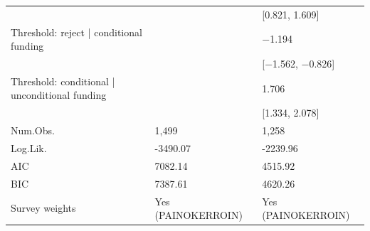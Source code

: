 \begin{tabular}{lll}
&  & [\num{0.821}, \num{1.609}] \\
Threshold: reject | conditional funding &  & \num{-1.194} \\
&  & [\num{-1.562}, \num{-0.826}] \\
Threshold: conditional | unconditional funding &  & \num{1.706} \\
&  & [\num{1.334}, \num{2.078}] \\
Num.Obs. & 1,499 & 1,258 \\
Log.Lik. & -3490.07 & -2239.96 \\
AIC & 7082.14 & 4515.92 \\
BIC & 7387.61 & 4620.26 \\
Survey weights & Yes (PAINOKERROIN) & Yes (PAINOKERROIN) \\
\end{tabular}
